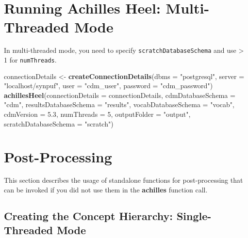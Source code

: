 \documentclass[]{article}
\newenvironment{Shaded}{\begin{snugshade}}{\end{snugshade}}
\newcommand{\KeywordTok}[1]{\textcolor[rgb]{0.13,0.29,0.53}{\textbf{#1}}}
\newcommand{\DataTypeTok}[1]{\textcolor[rgb]{0.13,0.29,0.53}{#1}}
\newcommand{\DecValTok}[1]{\textcolor[rgb]{0.00,0.00,0.81}{#1}}
\newcommand{\FloatTok}[1]{\textcolor[rgb]{0.00,0.00,0.81}{#1}}
\newcommand{\StringTok}[1]{\textcolor[rgb]{0.31,0.60,0.02}{#1}}
\newcommand{\NormalTok}[1]{#1}
\begin{document}
\section{Running Achilles Heel: Multi-Threaded
Mode}\label{running-achilles-heel-multi-threaded-mode}

In multi-threaded mode, you need to specify
\texttt{scratchDatabaseSchema} and use \textgreater{} 1 for
\texttt{numThreads}.

\begin{Shaded}
\begin{Highlighting}[]
\NormalTok{connectionDetails <-}\StringTok{ }\KeywordTok{createConnectionDetails}\NormalTok{(}\DataTypeTok{dbms =} \StringTok{"postgresql"}\NormalTok{, }
                                             \DataTypeTok{server =} \StringTok{"localhost/synpuf"}\NormalTok{, }
                                             \DataTypeTok{user =} \StringTok{"cdm_user"}\NormalTok{, }
                                             \DataTypeTok{password =} \StringTok{"cdm_password"}\NormalTok{)}
\KeywordTok{achillesHeel}\NormalTok{(}\DataTypeTok{connectionDetails =}\NormalTok{ connectionDetails, }
             \DataTypeTok{cdmDatabaseSchema =} \StringTok{"cdm"}\NormalTok{, }
             \DataTypeTok{resultsDatabaseSchema =} \StringTok{"results"}\NormalTok{, }
             \DataTypeTok{vocabDatabaseSchema =} \StringTok{"vocab"}\NormalTok{, }
             \DataTypeTok{cdmVersion =} \FloatTok{5.3}\NormalTok{, }
             \DataTypeTok{numThreads =} \DecValTok{5}\NormalTok{, }
             \DataTypeTok{outputFolder =} \StringTok{"output"}\NormalTok{, }
             \DataTypeTok{scratchDatabaseSchema =} \StringTok{"scratch"}\NormalTok{)}
\end{Highlighting}
\end{Shaded}

\section{Post-Processing}\label{post-processing}

This section describes the usage of standalone functions for
post-processing that can be invoked if you did not use them in the
\textbf{achilles} function call.

\subsection{Creating the Concept Hierarchy: Single-Threaded
Mode}\label{creating-the-concept-hierarchy-single-threaded-mode}
\end{document}
